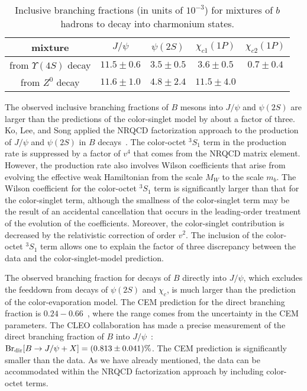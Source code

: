 \begin{table}[ht]
\begin{center}
\begin{tabular}{|c|cccc|} 
\hline
mixture & $J/\psi$ & $\psi(2S)$ & $\chi_{c1}(1P)$ & $\chi_{c2}(1P)$ \\ 
\hline
from $\Upsilon(4S)$ decay      
& $11.5 \pm 0.6$ &  $3.5 \pm 0.5$ &  $3.6 \pm 0.5$ &  $0.7 \pm 0.4$ \\ 
from $Z^0$ decay   
& $11.6 \pm 1.0$ &  $4.8 \pm 2.4$ & $11.5 \pm 4.0$ &              \\ 
\hline
\end{tabular}
\caption{Inclusive branching fractions (in units of $10^{-3}$)
for mixtures of $b$ hadrons to decay into charmonium states.
}
\label{prodsec:Brbcharm}
\end{center}
\end{table}


The observed inclusive branching fractions of $B$ mesons into $J/\psi$ and
$\psi(2S)$ are larger than the predictions of the color-singlet model by
about a factor of three. Ko, Lee, and Song applied the NRQCD
factorization approach to the production of $J/\psi$ and $\psi(2S)$ 
in $B$ decays~\cite{Ko:1995iv}. The color-octet ${}^3S_1$ term in the
production rate is suppressed by a factor of $v^4$ that comes from
the NRQCD matrix element. However, the production rate also involves
Wilson coefficients that arise from evolving the effective weak
Hamiltonian from the scale $M_W$ to the scale $m_b$. The Wilson
coefficient for the color-octet ${}^3S_1$ term is significantly larger
than that for the color-singlet term, although the smallness of the
color-singlet term may be the result of an accidental cancellation that
occurs in the leading-order treatment of the evolution of the
coefficients.  Moreover, the color-singlet contribution is
decreased by the relativistic correction of order $v^2$. 
The inclusion of the color-octet
${}^3S_1$ term allows one to explain the factor of three discrepancy
between the data and the color-singlet-model prediction.

The observed branching fraction for decays of $B$ directly into
$J/\psi$, which excludes the feeddown from decays of $\psi(2S)$ and
$\chi_c$, is much larger than the prediction of the color-evaporation
model.  The CEM prediction for the direct branching fraction is
$0.24-0.66$~\cite{Ko:1999zx}, where the range comes from the uncertainty
in the CEM parameters. The CLEO collaboration has made a precise
measurement of the direct branching fraction of $B$ into
$J/\psi$~\cite{Anderson:2002md}: 
${\rm Br}_{\rm dir}[B \to J/\psi+X] = (0.813\pm 0.041)\%$.  
The CEM prediction is significantly 
smaller than the data. As we have already mentioned, the data
can be accommodated within the 
NRQCD factorization approach by including color-octet terms. 

